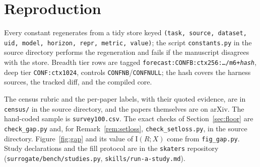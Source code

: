 \documentclass[11pt]{article}
\theoremstyle{remark}
\newcommand{\I}{\mathrm{I}}
\begin{document}
\section{Reproduction}\label{sec:repro}

Every constant regenerates from a tidy store keyed
\texttt{(task, source, dataset, uid, model, horizon, repr, metric, value)};
the script \texttt{constants.py} in the source directory performs the regeneration and fails if the manuscript disagrees with the store.
Breadth tier rows are tagged \texttt{forecast:CONFB:ctx256:\ldots/m6+\textit{hash}},
deep tier \texttt{CONF:ctx1024}, controls \texttt{CONFNB}/\texttt{CONFNULL};
the hash covers the harness sources, the tracked diff, and the compiled core.

The census rubric and the per-paper labels, with their quoted evidence, are in \texttt{census/} in the source directory, and the papers themselves are on arXiv. The
hand-coded sample is \texttt{survey100.csv}. The exact checks of
Section~\ref{sec:floor} are \texttt{check\_gap.py} and, for Remark~\ref{rem:setloss}, \texttt{check\_setloss.py}, in the source directory. Figure~\ref{fig:gap} and its value of $\I(R;X)$ come from \texttt{fig\_gap.py}. Study declarations and the fill protocol are in the \texttt{skaters}
repository (\texttt{surrogate/bench/studies.py}, \texttt{skills/run-a-study.md}).
\end{document}
